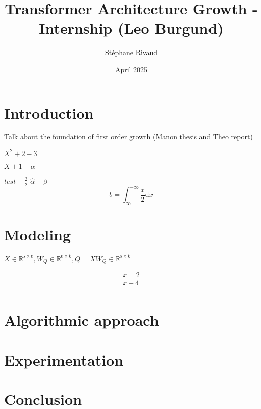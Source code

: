 \documentclass{article}
\title{Transformer Architecture Growth - Internship (Leo Burgund)}
\author{Stéphane Rivaud}
\date{April 2025}
\begin{document}
\maketitle

\section{Introduction}
Talk about the foundation of first order growth (Manon thesis and Theo report)

\( X ^2 + 2 -3 \)

\( X + 1 - \alpha  \)

$test - \frac{2}{2}$
$\hat{\alpha} + \hat{\beta}$
$$
b=\int_{\infty }^{-\infty} \frac{x}{2} \mathrm{d}x
$$

\section{Modeling}
$X \in \mathbb{R}^{s \times e}, W_Q \in \mathbb{R}^{e\times k} , Q=XW_Q \in \mathbb{R}^{s \times  k}$

$$
\begin{aligned}
  x=2\\
  x+4\\
\end{aligned}
$$

\section{Algorithmic approach}

\section{Experimentation}

\section{Conclusion}
\end{document}
